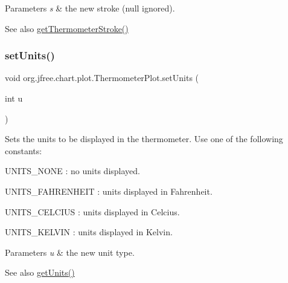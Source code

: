 \begin{DoxyParams}{Parameters}
{\em s} & the new stroke ({\ttfamily null} ignored).\\
\hline
\end{DoxyParams}
\begin{DoxySeeAlso}{See also}
\mbox{\hyperlink{classorg_1_1jfree_1_1chart_1_1plot_1_1_thermometer_plot_a88292665456e7753129e4fa88053ef07}{get\+Thermometer\+Stroke()}} 
\end{DoxySeeAlso}
\mbox{\label{classorg_1_1jfree_1_1chart_1_1plot_1_1_thermometer_plot_a854875ffe9c0e66313089d022effdd44}} 
\subsubsection{\texorpdfstring{set\+Units()}{setUnits()}\hspace{0.1cm}{\footnotesize\ttfamily [1/2]}}
{\footnotesize\ttfamily void org.\+jfree.\+chart.\+plot.\+Thermometer\+Plot.\+set\+Units (\begin{DoxyParamCaption}\item[{int}]{u }\end{DoxyParamCaption})}

Sets the units to be displayed in the thermometer. Use one of the following constants\+:


\begin{DoxyItemize}
\item U\+N\+I\+T\+S\+\_\+\+N\+O\+NE \+: no units displayed. 
\item U\+N\+I\+T\+S\+\_\+\+F\+A\+H\+R\+E\+N\+H\+E\+IT \+: units displayed in Fahrenheit. 
\item U\+N\+I\+T\+S\+\_\+\+C\+E\+L\+C\+I\+US \+: units displayed in Celcius. 
\item U\+N\+I\+T\+S\+\_\+\+K\+E\+L\+V\+IN \+: units displayed in Kelvin. 
\end{DoxyItemize}


\begin{DoxyParams}{Parameters}
{\em u} & the new unit type.\\
\hline
\end{DoxyParams}
\begin{DoxySeeAlso}{See also}
\mbox{\hyperlink{classorg_1_1jfree_1_1chart_1_1plot_1_1_thermometer_plot_a69a0570b65093596ac626a988a3bcdbf}{get\+Units()}} 
\end{DoxySeeAlso}
\mbox{\label{classorg_1_1jfree_1_1chart_1_1plot_1_1_thermometer_plot_a510997aa0dd8f93a502f50fa1e197bde}} 
